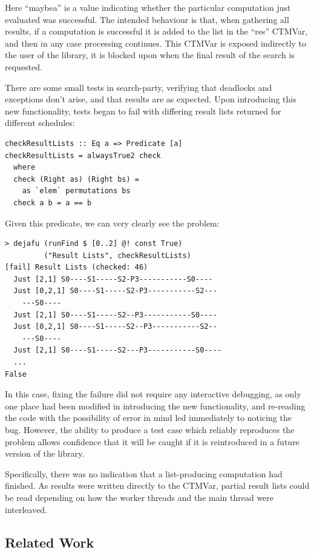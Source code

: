 Here ``maybea'' is a value indicating whether the particular
computation just evaluated was successful. The intended behaviour is
that, when gathering all results, if a computation is successful it is
added to the list in the ``res'' CTMVar, and then in any case
processing continues. This CTMVar is exposed indirectly to the user of
the library, it is blocked upon when the final result of the search is
requested.

There are some small tests in search-party, verifying that deadlocks
and exceptions don't arise, and that results are as expected. Upon
introducing this new functionality, tests began to fail with differing
result lists returned for different schedules:

\begin{verbatim}
checkResultLists :: Eq a => Predicate [a]
checkResultLists = alwaysTrue2 check
  where
  check (Right as) (Right bs) =
    as `elem` permutations bs
  check a b = a == b
\end{verbatim}

Given this predicate, we can very clearly see the problem:

\begin{verbatim}
> dejafu (runFind $ [0..2] @! const True)
         ("Result Lists", checkResultLists)
[fail] Result Lists (checked: 46)
  Just [2,1] S0----S1-----S2-P3-----------S0----
  Just [0,2,1] S0----S1-----S2-P3-----------S2---
    ---S0----
  Just [2,1] S0----S1-----S2--P3-----------S0----
  Just [0,2,1] S0----S1-----S2--P3-----------S2--
    ---S0----
  Just [2,1] S0----S1-----S2---P3-----------S0----
  ...
False
\end{verbatim}

In this case, fixing the failure did not require any interactive
debugging, as only one place had been modified in introducing the new
functionality, and re-reading the code with the possibility of error
in mind led immediately to noticing the bug. However, the ability to
produce a test case which reliably reproduces the problem allows
confidence that it will be caught if it is reintroduced in a future
version of the library.

Specifically, there was no indication that a list-producing
computation had finished. As results were written directly to the
CTMVar, partial result lists could be read depending on how the worker
threads and the main thread were interleaved.

\subsection{Related Work}
\label{sec:prelims-dejafu-related}

